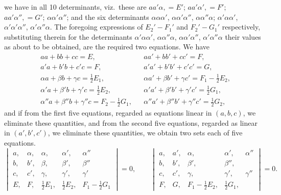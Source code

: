 \documentclass[11pt,a4paper]{article}
\begin{document}
\newpage
\noindent
we have in all 10 determinants, viz.\ these are $aa'\alpha,=E'$; $aa'\alpha',=F'$;
$aa'\alpha'',=G'$; $\alpha\alpha'\alpha''$; and the six determinants
$\alpha\alpha\alpha'$, $\alpha\alpha'\alpha''$, $\alpha\alpha''\alpha$;
$\alpha'\alpha\alpha'$, $\alpha'\alpha'\alpha''$, $\alpha'\alpha''\alpha$.
The foregoing expressions of $E_{2}'-F_{1}'$ and $F_{2}'-G_{1}'$
respectively, substituting therein for the determinants
$\alpha'\alpha\alpha'$, $\alpha\alpha''\alpha$, $\alpha\alpha'\alpha''$,
$\alpha'\alpha''\alpha$ their values as about to be obtained, are the
required two equations. We have
\begin{align*}
  &aa+bb+cc=E,           &&aa'+bb'+cc'=F,\\
  &a'a+b'b+c'c=F,        &&a'a'+b'b'+c'c'=G,\\
  &\alpha a+\beta b+\gamma c=\tfrac{1}{2}E_{1},  &&\alpha a'+\beta b'+\gamma c'=F_{1}-\tfrac{1}{2}E_{2},\\
  &\alpha'a+\beta'b+\gamma'c=\tfrac{1}{2}E_{2}, &&\alpha'a'+\beta'b'+\gamma'c'=\tfrac{1}{2}G_{1},\\
  &\alpha''a+\beta''b+\gamma''c=F_{2}-\tfrac{1}{2}G_{1}, &&\alpha''a'+\beta''b'+\gamma''c'=\tfrac{1}{2}G_{2},
\end{align*}
and if from the first five equations, regarded as equations linear in
$(a,b,c)$, we eliminate these quantities, and from the second five
equations, regarded as linear in $(a',b',c')$, we eliminate these
quantities, we obtain two sets each of five equations.
\[
  \begin{vmatrix} a,&\alpha,&\alpha,&\alpha',&\alpha''\\ b,&b',&\beta,&\beta',&\beta''\\ c,&c',&\gamma,&\gamma',&\gamma'\\ E,&F,&\tfrac{1}{2}E_{1},&\tfrac{1}{2}E_{2},&F_{1}-\tfrac{1}{2}G_{1} \end{vmatrix}=0,\qquad
  \begin{vmatrix} a,&a',&\alpha,&\alpha',&\alpha''\\ b,&b',&\beta',&\beta'',\\ c,&c',&\gamma,&\gamma',&\gamma''\\ F,&G,&F_{1}-\tfrac{1}{2}E_{2},&\tfrac{1}{2}G_{1},& \end{vmatrix}=0.
\]
\end{document}
